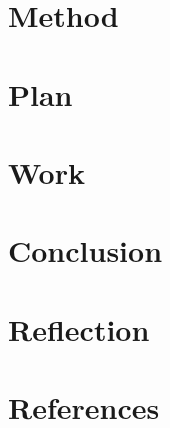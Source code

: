 \documentclass[a4paper]{article}
\begin{document}
\section{Method}

\section{Plan}

\section{Work}

\section{Conclusion}

\section{Reflection}

\section{References}
\end{document}
